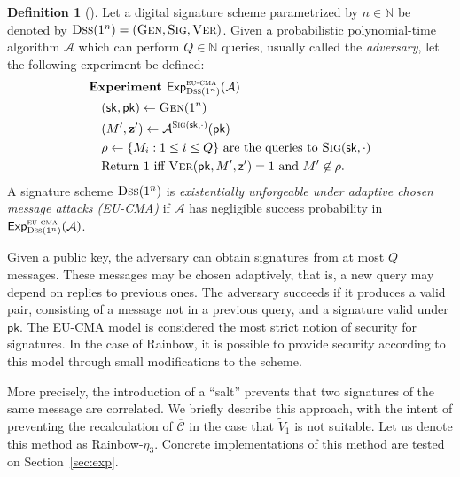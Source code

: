 \documentclass[english]{ufsc-thesis-rn46-2019/ufsc-thesis-rn46-2019}
\theoremstyle{definition}
\newtheorem{definition}[theorem]{Definition}
\begin{document}
\begin{definition}[{\cite[Def.~1.2]{Chen:201612}}]
  Let a digital signature scheme parametrized by $n \in \mathbb{N}$ be denoted
  by $\textsc{Dss}(1^{n}) = (\textsc{Gen}, \textsc{Sig}, \textsc{Ver})$.
  Given a probabilistic polynomial-time algorithm $\mathcal{A}$ which can
  perform $Q \in \mathbb{N}$ queries, usually called the \emph{adversary}, let
  the following experiment be defined:
  \begin{align}
    \begin{split}
      &\textbf{Experiment }
        \mathsf{Exp}_{\textsc{Dss}(1^{n})}^{\textsc{eu-cma}}(\mathcal{A}) \\
      &\quad
        (\mathsf{sk}, \mathsf{pk}) \gets \textsc{Gen}(1^{n}) \\
      &\quad
        (M', \mathbf{z'}) \gets
        \mathcal{A}^{\textsc{Sig}(\mathsf{sk}, \cdot)}(\mathsf{pk}) \\
      &\quad
        \rho \gets \{ M_{i} : 1 \leq i \leq Q \}
        \text{ are the queries to } \textsc{Sig}(\mathsf{sk}, \cdot) \\
      &\quad
        \text{Return 1 iff } \textsc{Ver}(\mathsf{pk}, M', \mathsf{z'}) = 1
        \text{ and } M' \not\in \rho.
    \end{split}
  \end{align}
  A signature scheme $\textsc{Dss}(1^{n})$ is \emph{existentially unforgeable
  under adaptive chosen message attacks (\textsf{EU-CMA})} if $\mathcal{A}$ has
  negligible success probability in
  $\mathsf{Exp}_{\textsc{Dss}(1^{n})}^{\textsc{eu-cma}}(\mathcal{A})$.
\end{definition}

Given a public key, the adversary can obtain signatures from at most $Q$
messages. These messages may be chosen adaptively, that is, a new query may
depend on replies to previous ones. The adversary succeeds if it produces
a valid pair, consisting of a message not in a previous query, and a signature
valid under $\mathsf{pk}$. The \textsf{EU-CMA} model is considered the most
strict notion of security for signatures. In the case of Rainbow, it is
possible to provide security according to this model through small
modifications to the scheme.

More precisely, the introduction of a ``salt'' prevents that two signatures of
the same message are correlated. We briefly describe this approach, with the
intent of preventing the recalculation of $\overline{\mathcal{C}}$ in the case
that $\widetilde{V}_{1}$ is not suitable. Let us denote this method as
Rainbow-$\eta_{3}$. Concrete implementations of this method are tested on
Section~\ref{sec:exp}.
\end{document}
